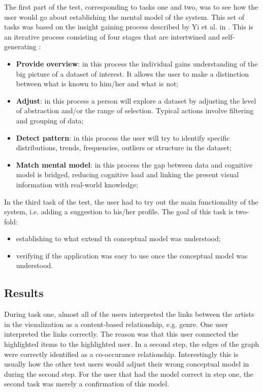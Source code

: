 \documentclass[a4paper,10pt,twocolumn]{article}
\begin{document}
The first part of the test, corresponding to tasks one and two, was to see how the user would go about establishing the mental model of the system. This set of tasks was based on the insight gaining process described by Yi et al. in \cite{yi2008}. This is an iterative process consisting of four stages that are intertwined and self-generating \cite{yi2008}:

\begin{itemize}
	\item \textbf{Provide overview}: in this process the individual gains understanding of the big picture of a dataset of interest. It allows the user to make a distinction between what is known to him/her and what is not;
	\item \textbf{Adjust}: in this process a person will explore a dataset by adjusting the level of abstraction and/or the range of selection. Typical actions involve filtering and grouping of data;
	\item	\textbf{Detect pattern}: in this process the user will try to identify specific distributions, trends, frequencies, outliers or structure in the dataset;
	\item \textbf{Match mental model}: in this process the gap between data and cognitive model is bridged, reducing cognitive load and linking the present visual information with real-world knowledge;
\end{itemize}

In the third task of the test, the user had to try out the main functionality of the system, i.e. adding a suggestion to his/her profile. The goal of this task is two-fold:

\begin{itemize}
	\item establishing to what extend th conceptual model was understood;
	\item verifying if the application was easy to use once the conceptual model was understood.
\end{itemize}


\subsection*{Results}

During task one, almost all of the users interpreted the links between the artists in the visualization as a content-based relationship, e.g. genre. One user interpreted the links correctly. The reason was that this user connected the highlighted items to the highlighted user. In a second step, the edges of the graph were correctly identified as a co-occurance relationship. Interestingly this is usually how the other test users would adjust their wrong conceptual model in during the second step. For the user that had the model correct in step one, the second task was merely a confirmation of this model.
\end{document}
